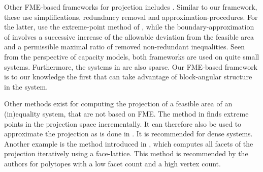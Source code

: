 \documentclass{llncs}
\begin{document}
Other FME-based frameworks for projection includes \cite{simon05,lukatskii08,shapot12}. 
Similar to our framework, these use simplifications, redundancy removal and approximation-procedures. For the latter, \cite{simon05} use the extreme-point method of \cite{huynh92}, while the boundary-approximation of \cite{lukatskii08,shapot12} involves a successive increase of the allowable deviation from the feasible area and a permissible maximal ratio of removed non-redundant inequalities.
Seen from the perspective of capacity models, both frameworks are used on quite small systems. Furthermore, the systems in \cite{simon} are also sparse. %
Our FME-based framework is to our knowledge the first that can take advantage of block-angular structure in the system.


Other methods exist for computing the projection of a feasible area of an (in)equality system, that are not based on FME. The method in \cite{huynh92} finds extreme points in the projection space incrementally. It can therefore also be used to approximate the projection as is done in \cite{simon05}. It is recommended for dense systems. %
Another example is the method introduced in \cite{jones04}, which computes all facets of the projection iteratively using a face-lattice. 
This method is recommended by the authors for polytopes with a low facet count and a high vertex count.
\end{document}
